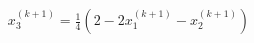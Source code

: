 \documentclass[preview]{standalone}
\begin{document}
\begin{align*}
x_3^{(k+1)} = \frac{1}{4}(2 - 2x_1^{(k+1)} - x_2^{(k+1)})
\end{align*}
\end{document}

